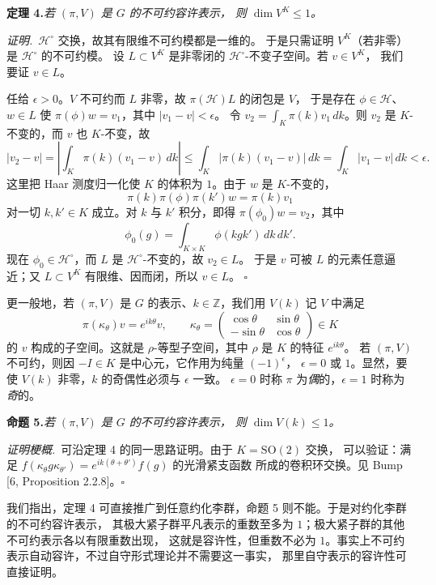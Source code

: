 \par\medskip\noindent\textbf{定理 4.}\quad\emph{若 $(\pi,V)$ 是 $G$ 的不可约容许表示，
则 $\dim V^{K}\le1$。}

\smallskip
\noindent\emph{证明.}\ $\mathcal{H}^{\circ}$ 交换，故其有限维不可约模都是一维的。
于是只需证明 $V^{K}$（若非零）是 $\mathcal{H}^{\circ}$ 的不可约模。
设 $L\subset V^{K}$ 是非零闭的 $\mathcal{H}^{\circ}$-不变子空间。若 $v\in V^{K}$，
我们要证 $v\in L$。

任给 $\epsilon>0$。$V$ 不可约而 $L$ 非零，故 $\pi(\mathcal{H})L$ 的闭包是 $V$，
于是存在 $\phi\in\mathcal{H}$、$w\in L$ 使 $\pi(\phi)w=v_{1}$，其中 $|v_{1}-v|<\epsilon$。
令 $v_{2}=\int_{K}\pi(k)v_{1}\,dk$。则 $v_{2}$ 是 $K$-不变的，而 $v$ 也 $K$-不变，故
\[
|v_{2}-v|=\left|\int_{K}\pi(k)(v_{1}-v)\,dk\right|
\le\int_{K}|\pi(k)(v_{1}-v)|\,dk=\int_{K}|v_{1}-v|\,dk<\epsilon .
\]
这里把 Haar 测度归一化使 $K$ 的体积为 $1$。由于 $w$ 是 $K$-不变的，
\[
\pi(k)\pi(\phi)\pi(k')w=\pi(k)v_{1}
\]
对一切 $k,k'\in K$ 成立。对 $k$ 与 $k'$ 积分，即得 $\pi(\phi_{0})w=v_{2}$，其中
\[
\phi_{0}(g)=\int_{K\times K}\phi(kgk')\,dk\,dk'.
\]
现在 $\phi_{0}\in\mathcal{H}^{\circ}$，而 $L$ 是 $\mathcal{H}^{\circ}$-不变的，故 $v_{2}\in L$。
于是 $v$ 可被 $L$ 的元素任意逼近；又 $L\subset V^{K}$ 有限维、因而闭，所以 $v\in L$。
\hfill$\square$

更一般地，若 $(\pi,V)$ 是 $G$ 的表示、$k\in\mathbb{Z}$，我们用 $V(k)$ 记 $V$ 中满足
\[
\pi(\kappa_{\theta})v=e^{ik\theta}v,\qquad
\kappa_{\theta}=\begin{pmatrix}\cos\theta&\sin\theta\\-\sin\theta&\cos\theta\end{pmatrix}\in K
\]
的 $v$ 构成的子空间。这就是 $\rho$-等型子空间，其中 $\rho$ 是 $K$ 的特征 $e^{ik\theta}$。
若 $(\pi,V)$ 不可约，则因 $-I\in K$ 是中心元，它作用为纯量 $(-1)^{\epsilon}$，
$\epsilon=0$ 或 $1$。显然，要使 $V(k)$ 非零，$k$ 的奇偶性必须与 $\epsilon$ 一致。
$\epsilon=0$ 时称 $\pi$ 为\emph{偶}的，$\epsilon=1$ 时称为\emph{奇}的。

\par\medskip\noindent\textbf{命题 5.}\quad\emph{若 $(\pi,V)$ 是 $G$ 的不可约容许表示，
则 $\dim V(k)\le1$。}

\smallskip
\noindent\emph{证明梗概.}\ 可沿定理 4 的同一思路证明。由于 $K=\mathrm{SO}(2)$ 交换，
可以验证：满足 $f(\kappa_{\theta}g\kappa_{\theta'})=e^{ik(\theta+\theta')}f(g)$ 的光滑紧支函数
所成的卷积环交换。见 Bump [6, Proposition 2.2.8]。\hfill$\square$

我们指出，定理 4 可直接推广到任意约化李群，命题 5 则不能。于是对约化李群的不可约容许表示，
其极大紧子群平凡表示的重数至多为 $1$；极大紧子群的其他不可约表示各以有限重数出现，
这就是容许性，但重数不必为 $1$。事实上不可约表示自动容许，不过自守形式理论并不需要这一事实，
那里自守表示的容许性可直接证明。

